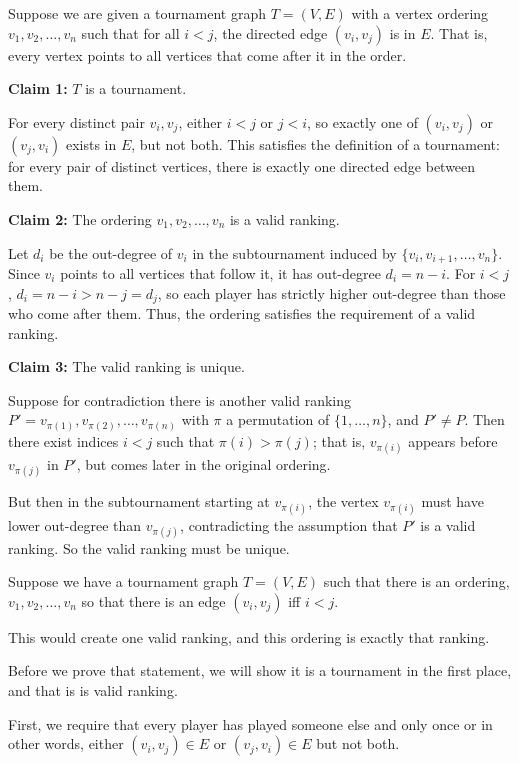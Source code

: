 \begin{soln}
	Suppose we are given a tournament graph \(T = (V, E)\) with a vertex ordering \(v_1, v_2, \dots, v_n\) such that for all \(i < j\), the directed edge \((v_i, v_j)\) is in \(E\). That is, every vertex points to all vertices that come after it in the order.

	\textbf{Claim 1:} \(T\) is a tournament.

	For every distinct pair \(v_i, v_j\), either \(i < j\) or \(j < i\), so exactly one of \((v_i, v_j)\) or \((v_j, v_i)\) exists in \(E\), but not both. This satisfies the definition of a tournament: for every pair of distinct vertices, there is exactly one directed edge between them.

	\textbf{Claim 2:} The ordering \(v_1, v_2, \dots, v_n\) is a valid ranking.

	Let \(d_i\) be the out-degree of \(v_i\) in the subtournament induced by \(\{v_i, v_{i+1}, \dots, v_n\}\). Since \(v_i\) points to all vertices that follow it, it has out-degree \(d_i = n - i\). For \(i < j\), \(d_i = n - i > n - j = d_j\), so each player has strictly higher out-degree than those who come after them. Thus, the ordering satisfies the requirement of a valid ranking.

	\textbf{Claim 3:} The valid ranking is unique.

	Suppose for contradiction there is another valid ranking \(P' = v_{\pi(1)}, v_{\pi(2)}, \dots, v_{\pi(n)}\) with \(\pi\) a permutation of \(\{1, \dots, n\}\), and \(P' \ne P\). Then there exist indices \(i < j\) such that \(\pi(i) > \pi(j)\); that is, \(v_{\pi(i)}\) appears before \(v_{\pi(j)}\) in \(P'\), but comes later in the original ordering.

	But then in the subtournament starting at \(v_{\pi(i)}\), the vertex \(v_{\pi(i)}\) must have lower out-degree than \(v_{\pi(j)}\), contradicting the assumption that \(P'\) is a valid ranking. So the valid ranking must be unique.

	Suppose we have a tournament graph \(T = (V, E)\) such that there is an ordering, \(v_1, v_2, \dots, v_n\) so that there is an edge \((v_i, v_j)\) iff \(i < j\).

	This would create one valid ranking, and this ordering is exactly that ranking.

	Before we prove that statement, we will show it is a tournament in the first place, and that is is valid ranking.

	First, we require that every player has played someone else and only once or in other words, either \((v_i, v_j) \in E\) or \((v_j, v_i) \in E\) but not both.


\end{soln}
